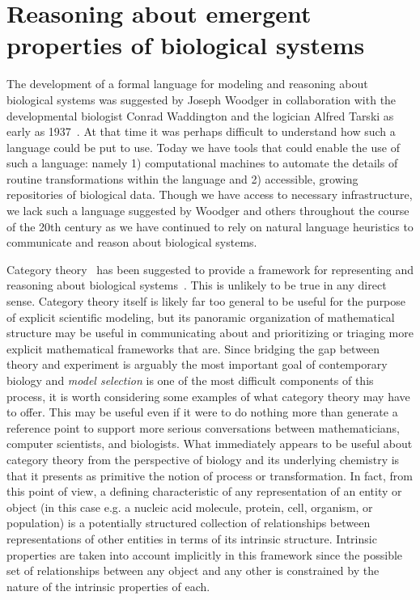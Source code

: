 \documentclass[aps,twocolumn]{revtex4-1}
\begin{document}
\maketitle

\tableofcontents

\section{Reasoning about emergent properties of biological systems}

The development of a formal language for modeling and reasoning about biological systems was suggested by Joseph Woodger in collaboration with the developmental biologist Conrad Waddington and the logician Alfred Tarski as early as 1937~\cite{Woodger1937,Woodger1951,Woodger1952,Woodger1952a}. At that time it was perhaps difficult to understand how such a language could be put to use. Today we have tools that could enable the use of such a language: namely 1) computational machines to automate the details of routine transformations within the language and 2) accessible, growing repositories of biological data. Though we have access to necessary infrastructure, we lack such a language suggested by Woodger and others throughout the course of the 20th century as we have continued to rely on natural language heuristics to communicate and reason about biological systems.

Category theory~\cite{Lane1985,Lane1998,MacLane1992,Lawvere1997,Lawvere2003,Awodey2006} has been suggested to provide a framework for representing and reasoning about biological systems~\cite{Rashevsky1954,Rosen1958,Rosen1958a,Rosen1978,GOGUEN1979,Rosen1985,Rosen1991}. This is unlikely to be true in any direct sense. Category theory itself is likely far too general to be useful for the purpose of explicit scientific modeling, but its panoramic organization of mathematical structure may be useful in communicating about and prioritizing or triaging more explicit mathematical frameworks that are. Since bridging the gap between theory and experiment is arguably the most important goal of contemporary biology and {\it model selection} is one of the most difficult components of this process, it is worth considering some examples of what category theory may have to offer. This may be useful even if it were to do nothing more than generate a reference point to support more serious conversations between mathematicians, computer scientists, and biologists. What immediately appears to be useful about category theory from the perspective of biology and its underlying chemistry is that it presents as primitive the notion of process or transformation. In fact, from this point of view, a defining characteristic of any representation of an entity or object (in this case e.g. a nucleic acid molecule, protein, cell, organism, or population) is a potentially structured collection of relationships between representations of other entities in terms of its intrinsic structure. Intrinsic properties are taken into account implicitly in this framework since the possible set of relationships between any object and any other is constrained by the nature of the intrinsic properties of each.
\end{document}
